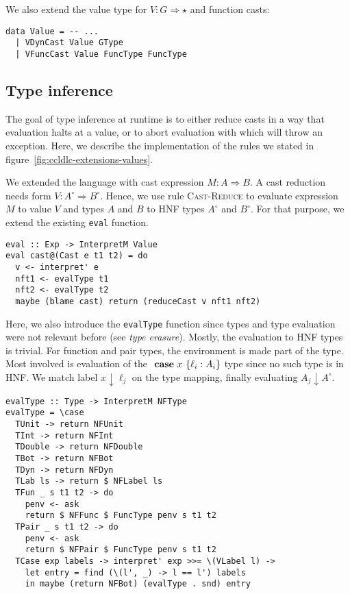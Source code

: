 We also extend the value type for $V : G \Rightarrow \star$ and function casts:

\begin{lstlisting}[caption=ProcessEnvironment.hs]
data Value = -- ...
  | VDynCast Value GType
  | VFuncCast Value FuncType FuncType
\end{lstlisting}


\subsection{Type inference}

The goal of type inference at runtime is to either reduce casts in a way that evaluation halts at a value, or to abort evaluation with \blame which will throw an exception. Here, we describe the implementation of the rules we stated in figure~\ref{fig:ccldlc-extensions-values}.

We extended the language with cast expression $M : A \Rightarrow B$. A cast reduction needs form $V : A^\circ \Rightarrow B^\circ$. Hence, we use rule \textsc{Cast-Reduce} to evaluate expression $M$ to value $V$ and types $A$ and $B$ to HNF types $A^\circ$ and $B^\circ$. For that purpose, we extend the existing \texttt{eval} function.

\begin{lstlisting}[caption=Interpreter.hs,label=lst:cast-reduce]
eval :: Exp -> InterpretM Value
eval cast@(Cast e t1 t2) = do
  v <- interpret' e
  nft1 <- evalType t1
  nft2 <- evalType t2
  maybe (blame cast) return (reduceCast v nft1 nft2)
\end{lstlisting}

Here, we also introduce the \texttt{evalType} function since types and type evaluation were not relevant before (see \emph{type erasure}). Mostly, the evaluation to HNF types is trivial. For function and pair types, the environment is made part of the type. Most involved is evaluation of the $\text{ \textbf{case} } x~\{\ell_i : A_i\}$ type since no such type is in HNF. We match label $x \downarrow \ell_j$ on the type mapping, finally evaluating $A_j \downarrow A^\circ$.

\begin{lstlisting}[caption=Interpreter.hs]
evalType :: Type -> InterpretM NFType
evalType = \case
  TUnit -> return NFUnit
  TInt -> return NFInt
  TDouble -> return NFDouble
  TBot -> return NFBot
  TDyn -> return NFDyn
  TLab ls -> return $ NFLabel ls
  TFun _ s t1 t2 -> do
    penv <- ask
    return $ NFFunc $ FuncType penv s t1 t2
  TPair _ s t1 t2 -> do
    penv <- ask
    return $ NFPair $ FuncType penv s t1 t2
  TCase exp labels -> interpret' exp >>= \(VLabel l) ->
    let entry = find (\(l', _) -> l == l') labels
    in maybe (return NFBot) (evalType . snd) entry
\end{lstlisting}

